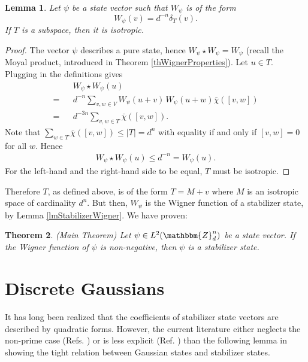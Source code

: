 \documentclass[aps,twocolumn,floatfix]{revtex4}
\newtheorem{theorem}{Theorem}
\newtheorem{lemma}[theorem]{Lemma}
\def\ZZ{\mathbbm{Z}}
\begin{document}
\begin{lemma}
	Let $\psi$ be a state vector such that $W_\psi$ is of the form
	\begin{equation*}
		W_\psi(v) = d^{-n} \delta_T(v).
	\end{equation*}
	If $T$ is a subspace,
	then it is isotropic.
\end{lemma}

\begin{proof}
	The vector $\psi$ describes a pure state, hence $W_\psi \star
	W_\psi=W_\psi$ (recall the Moyal product, introduced in Theorem
	\ref{thWignerProperties}).  Let $u\in T$. Plugging in the
	definitions gives
	\begin{eqnarray*}
		&&W_\psi \star W_\psi (u)\\
		=&& d^{-n} 
		\sum_{v,w\in V} W_\psi(u+v) \, W_\psi(u+w) \bar\chi([v,w])\\
		=&& d^{-3n} \sum_{v,w\in T} \bar\chi([v,w]).
	\end{eqnarray*}
	Note that $\sum_{w\in T}\bar\chi([v,w])\leq|T|=d^n$ with equality if
	and only if $[v,w]=0$ for all $w$. Hence
	\begin{eqnarray*}
		W_\psi \star W_\psi(u) 
		\leq d^{-n} = W_\psi(u).
	\end{eqnarray*}
	For the left-hand and the right-hand side to be equal, $T$ must be
	isotropic.
\end{proof}
		
Therefore $T$, as defined above, is of the form $T=M+v$ where $M$ is
an isotropic space of cardinality $d^n$. But then, $W_\psi$ is the
Wigner function of a stabilizer state, by Lemma
\ref{lmStabilizerWigner}. We have proven:

\begin{theorem}\emph{(Main Theorem)}
	Let $\psi\in L^2(\ZZ_d^n)$ be a state vector. If the Wigner function
	of $\psi$ is non-negative, then $\psi$ is a stabilizer state.
\end{theorem}

	
\section{Discrete Gaussians}
\label{scDiscreteGaussians}

It has long been realized that the coefficients of stabilizer state
vectors are described by quadratic forms.  However, the current
literature either neglects the non-prime case (Refs.
\cite{schlinge,grassl,dehaene}) or is less explicit (Ref.
\cite{erik}) than the following lemma in showing the tight relation
between Gaussian states and stabilizer states.
\end{document}
